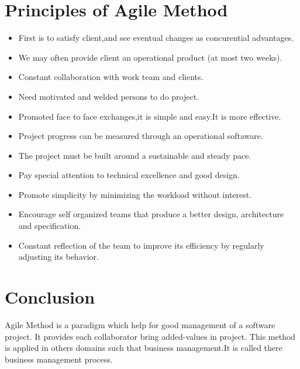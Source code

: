 \documentclass[12pt]{article}
\begin{document}
\section{Principles of Agile Method}
\begin{itemize}

 \item First is to satisfy client,and see eventual changes as concurential advantages.
\item We may often provide client an operational product (at most two weeks).
\item Constant collaboration with work team and clients.
\item Need motivated and welded persons to do project.
\item  Promoted face to face exchanges,it is simple and easy.It is more effective.
\item  Project progress can be measured through an operational softaware.
\item The project must be built around a sustainable and steady pace.
\item Pay special attention to technical excellence and good design.
\item Promote simplicity by minimizing the workload without interest.
\item Encourage self organized teams that produce a better design, architecture and specification.
\item Constant reflection of the team to improve its efficiency by regularly adjusting its behavior.
\end{itemize}
\section{Conclusion}
Agile Method is a paradigm which help for good management of a software project.
It provides each collaborator bring added-values in project.
This method is applied in others domains such that business management.It is called there business management process. 
\end{document}
